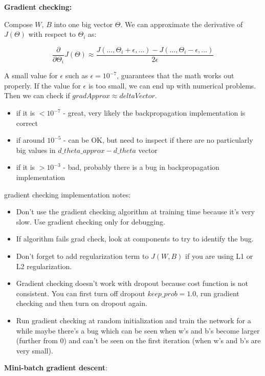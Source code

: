 \documentclass{article}
\begin{document}
\noindent \textbf{Gradient checking:}

\noindent Compose \(W\), \(B\) into one big vector \(\Theta\). We can approximate the derivative of \(J(\Theta)\) with respect to \(\Theta_{i}\) as:

\[\frac{\partial}{\partial \Theta_{i}} J(\Theta) \approx \frac{J(\dots, \Theta_{i} + \epsilon, \dots) - J(\dots, \Theta_{i} - \epsilon, \dots)}{2\epsilon}\]

\noindent A small value for \(\epsilon\) such as \(\epsilon = 10^{-7}\), guarantees that the math works out properly. If the value for \(\epsilon\) is too small, we can end up with numerical problems. Then we can check if \(gradApprox \approx deltaVector\).

\begin{itemize}
  \item if it is \(< 10^{-7}\) - great, very likely the backpropagation implementation is correct
  \item if around \(10^{-5}\) - can be OK, but need to inspect if there are no particularly big values in \(d\_theta\_approx - d\_theta\) vector
  \item if it is \(> 10^{-3}\) - bad, probably there is a bug in backpropagation implementation
\end{itemize}

\noindent gradient checking implementation notes:

\begin{itemize}
  \item Don't use the gradient checking algorithm at training time because it's very slow. Use gradient checking only for debugging.
  \item If algorithm fails grad check, look at components to try to identify the bug.
  \item Don't forget to add regularization term to \(J(W, B)\) if you are using L1 or L2 regularization.
  \item Gradient checking doesn't work with dropout because cost function is not consistent. You can first turn off dropout \(keep\_prob = 1.0\), run gradient checking and then turn on dropout again.
  \item Run gradient checking at random initialization and train the network for a while maybe there's a bug which can be seen when w's and b's become larger (further from 0) and can't be seen on the first iteration (when w's and b's are very small).
\end{itemize}

\noindent \textbf{Mini-batch gradient descent}:
\end{document}
